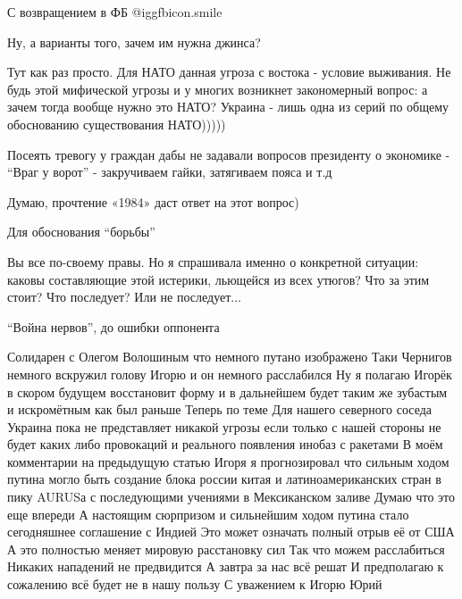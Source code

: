 \begin{itemize}
С возвращением в ФБ  @igg{fbicon.smile} 

Ну, а варианты того, зачем им нужна джинса?

\begin{itemize} %

Тут как раз просто. Для НАТО данная угроза с востока - условие выживания. Не
будь этой мифической угрозы и у многих возникнет закономерный вопрос: а зачем
тогда вообще нужно это НАТО? Украина - лишь одна из серий по общему обоснованию
существования НАТО)))))


Посеять тревогу у граждан дабы не задавали вопросов президенту о
экономике - \enquote{Враг у ворот} - закручиваем гайки, затягиваем пояса и т.д

Думаю, прочтение «1984» даст ответ на этот вопрос)

Для обоснования \enquote{борьбы}

Вы все по-своему правы.
Но я спрашивала именно о конкретной ситуации: каковы составляющие этой истерики, льющейся из всех утюгов? Что за этим стоит? Что последует? Или не последует...

\enquote{Война нервов}, до ошибки оппонента
\end{itemize} %


Солидарен с Олегом Волошиным что немного путано изображено Таки Чернигов
немного вскружил голову Игорю и он немного расслабился Ну я полагаю Игорёк в
скором будущем восстановит форму и в дальнейшем будет таким же зубастым и
искромётным как был раньше Теперь по теме Для нашего северного соседа Украина
пока не представляет никакой угрозы если только с нашей стороны не будет каких
либо провокаций и реального появления инобаз с ракетами В моём комментарии на
предыдущую статью Игоря я прогнозировал что сильным ходом путина могло быть
создание блока россии китая и латиноамериканских стран в пику AURUSа с
последующими учениями в Мексиканском заливе Думаю что это еще впереди А
настоящим сюрпризом и сильнейшим ходом путина стало сегодняшнее соглашение с
Индией Это может означать полный отрыв её от США А это полностью меняет мировую
расстановку сил Так что можем расслабиться Никаких нападений не предвидится А
завтра за нас всё решат И предполагаю к сожалению всё будет не в нашу пользу С
уважением к Игорю Юрий


\end{itemize}
